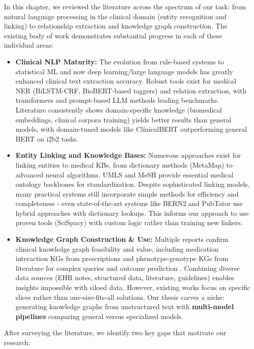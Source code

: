 In this chapter, we reviewed the literature across the spectrum of our task: from natural language processing in the clinical domain (entity recognition and linking) to relationship extraction and knowledge graph construction. The existing body of work demonstrates substantial progress in each of these individual areas:

\begin{itemize}
\item \textbf{Clinical NLP Maturity:} The evolution from rule-based systems to statistical ML and now deep learning/large language models has greatly enhanced clinical text extraction accuracy. Robust tools exist for medical NER (BiLSTM-CRF, BioBERT-based taggers) and relation extraction, with transformers and prompt-based LLM methods leading benchmarks. Literature consistently shows domain-specific knowledge (biomedical embeddings, clinical corpora training) yields better results than general models, with domain-tuned models like ClinicalBERT outperforming general BERT on i2b2 tasks.

\item \textbf{Entity Linking and Knowledge Bases:} Numerous approaches exist for linking entities to medical KBs, from dictionary methods (MetaMap) to advanced neural algorithms. UMLS and MeSH provide essential medical ontology backbones for standardization. Despite sophisticated linking models, many practical systems still incorporate simple methods for efficiency and completeness - even state-of-the-art systems like BERN2 and PubTator use hybrid approaches with dictionary lookups. This informs our approach to use proven tools (SciSpacy) with custom logic rather than training new linkers.

\item \textbf{Knowledge Graph Construction \& Use:} Multiple reports confirm clinical knowledge graph feasibility and value, including medication interaction KGs from prescriptions and phenotype-genotype KGs from literature for complex queries and outcome prediction \parencite{Rotmensch2017}. Combining diverse data sources (EHR notes, structured data, literature, guidelines) enables insights impossible with siloed data. However, existing works focus on specific slices rather than one-size-fits-all solutions. Our thesis carves a niche: generating knowledge graphs from unstructured text with \textbf{multi-model pipelines} comparing general versus specialized models.
\end{itemize}

After surveying the literature, we identify two key gaps that motivate our research:

